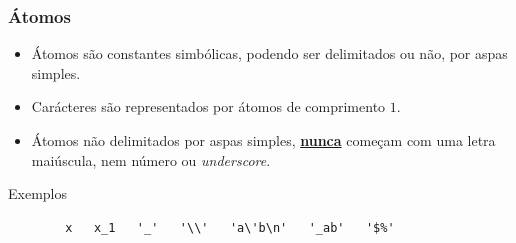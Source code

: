 
\begin{frame}[fragile]
	\frametitle{Átomos}
	
	\begin{itemize}
	  \item Átomos são constantes simbólicas, podendo ser delimitados ou não, por 
	aspas simples.
	
	\item Carácteres são representados por átomos de comprimento $1$.
	
	 	\item Átomos não delimitados por aspas simples, \underline{\textbf{nunca}} começam com uma letra maiúscula, nem número ou \textit{underscore}.

	\end{itemize} 

	  \pause 
	\begin{block}{Exemplos}
		\begin{verbatim}
		x   x_1   '_'   '\\'   'a\'b\n'   '_ab'   '$%'
		\end{verbatim}
	\end{block}
	
\end{frame}


